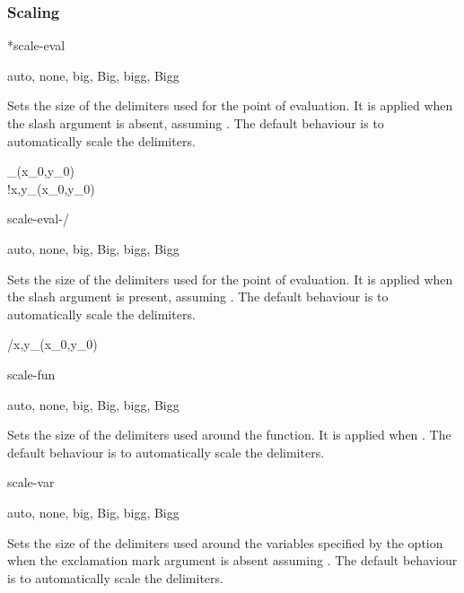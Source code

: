 \subsubsection*{Scaling}

\begin{option}*{scale-eval}
	\begin{values}[default = auto]
		auto, none, big, Big, bigg, Bigg
	\end{values}
	Sets the size of the delimiters used for the point of evaluation. It is applied when the slash argument is absent, assuming . The default behaviour is to automatically scale the delimiters.
	\begin{example}
		_{(x_0,y_0)}\\
		!{x,y}_{(x_0,y_0)}
	\end{example}
\end{option}

\begin{option}{scale-eval-/}
	\begin{values}[default = auto]
		auto, none, big, Big, bigg, Bigg
	\end{values}
	Sets the size of the delimiters used for the point of evaluation. It is applied when the slash argument is present, assuming . The default behaviour is to automatically scale the delimiters.
	\begin{example}
		/{x,y}_{(x_0,y_0)}
	\end{example}
\end{option}

\begin{option}{scale-fun}
	\begin{values}[default = auto]
		auto, none, big, Big, bigg, Bigg
	\end{values}
	Sets the size of the delimiters used around the function. It is applied when . The default behaviour is to automatically scale the delimiters.
	\begin{example}
		\pdv[scale-fun=big, fun]{f}{x,y}
	\end{example}
\end{option}

\begin{option}{scale-var}
	\begin{values}[default = auto]
		auto, none, big, Big, bigg, Bigg
	\end{values}
	Sets the size of the delimiters used around the variables specified by the  option when the exclamation mark argument is absent assuming . The default behaviour is to automatically scale the delimiters.
	\begin{example}
		\pdv[scale-var=Big, var]{f}{x,y}
	\end{example}
\end{option}

